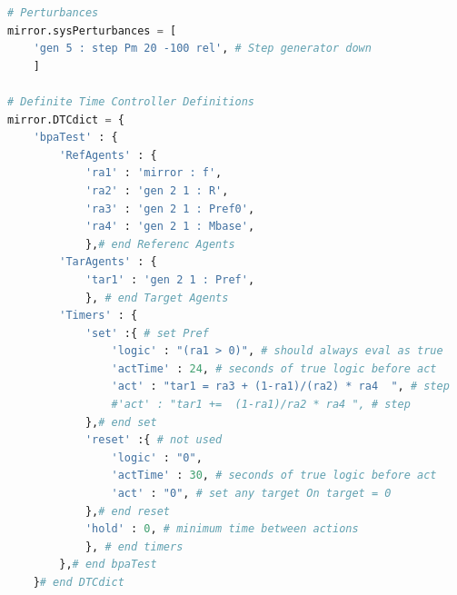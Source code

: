 \documentclass[12pt]{article}
\begin{document}
\begin{lstlisting}[language=Python]
# Perturbances
mirror.sysPerturbances = [
    'gen 5 : step Pm 20 -100 rel', # Step generator down
    ]

# Definite Time Controller Definitions
mirror.DTCdict = {
    'bpaTest' : {
        'RefAgents' : {
            'ra1' : 'mirror : f',
            'ra2' : 'gen 2 1 : R', 
            'ra3' : 'gen 2 1 : Pref0',
            'ra4' : 'gen 2 1 : Mbase',
            },# end Referenc Agents
        'TarAgents' : {
            'tar1' : 'gen 2 1 : Pref',
            }, # end Target Agents
        'Timers' : {
            'set' :{ # set Pref
                'logic' : "(ra1 > 0)", # should always eval as true
                'actTime' : 24, # seconds of true logic before act
                'act' : "tar1 = ra3 + (1-ra1)/(ra2) * ra4  ", # step 
                #'act' : "tar1 +=  (1-ra1)/ra2 * ra4 ", # step 
            },# end set
            'reset' :{ # not used
                'logic' : "0",
                'actTime' : 30, # seconds of true logic before act
                'act' : "0", # set any target On target = 0
            },# end reset
            'hold' : 0, # minimum time between actions
            }, # end timers
        },# end bpaTest
    }# end DTCdict

\end{lstlisting}
\end{document}
